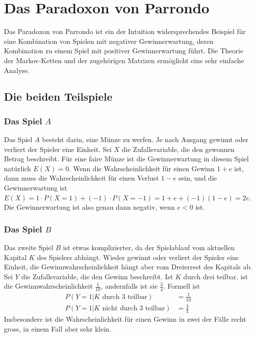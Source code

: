 %
%
%
\section{Das Paradoxon von Parrondo
\label{buch:section:paradoxon-von-parrondo}}
Das Paradoxon von Parrondo ist ein der Intuition widersprechendes
Beispiel für eine Kombination von Spielen mit negativer Gewinnerwartung,
deren Kombination zu einem Spiel mit positiver Gewinnerwartung führt.
Die Theorie der Markov-Ketten und der zugehörigen Matrizen ermöglicht
eine sehr einfache Analyse.

%
%
\subsection{Die beiden Teilspiele
\label{buch:subsection:teilspiele}}

\subsubsection{Das Spiel $A$}
Das Spiel $A$ besteht darin, eine Münze zu werfen.
Je nach Ausgang gewinnt oder verliert der Spieler eine Einheit.
Sei $X$ die Zufallsvariable, die den gewonnen Betrag beschreibt.
Für eine faire Münze ist die Gewinnerwartung in diesem Spiel natürlich
$E(X)=0$.
Wenn die Wahrscheinlichkeit für einen Gewinn $1+e$ ist, dann muss
die Wahrscheinlichkeit für einen Verlust $1-e$ sein, und die 
Gewinnerwartung ist
\(
E(X)
=
1\cdot P(X=1) + (-1)\cdot P(X=-1)
=
1+e + (-1)(1-e)
=
2e.
\)
Die Gewinnerwartung ist also genau dann negativ, wenn $e<0$ ist.

\subsubsection{Das Spiel $B$}
Das zweite Spiel $B$ ist etwas komplizierter, da der Spielablauf vom 
aktuellen Kapital $K$ des Spielers abhängt.
Wieder gewinnt oder verliert der Spieler eine Einheit,
die Gewinnwahrscheinlichkeit hängt aber vom Dreierrest des Kapitals ab.
Sei $Y$ die Zufallsvariable, die den Gewinn beschreibt.
Ist $K$ durch drei teilbar, ist die Gewinnwahrscheinlichkeit $\frac1{10}$,
andernfalls ist sie $\frac34$.
Formell ist
\begin{equation}
\begin{aligned}
P(Y=1|\text{$K$ durch $3$ teilbar}) &=  \frac{1}{10}
\\
P(Y=1|\text{$K$ nicht durch $3$ teilbar}) &= \frac{3}{4}
\end{aligned}
\label{buch:wahrscheinlichkeit:eqn:Bwahrscheinlichkeiten}
\end{equation}
Insbesondere ist die Wahrscheinlichkeit für einen Gewinn in zwei der
Fälle recht gross, in einem Fall aber sehr klein.

